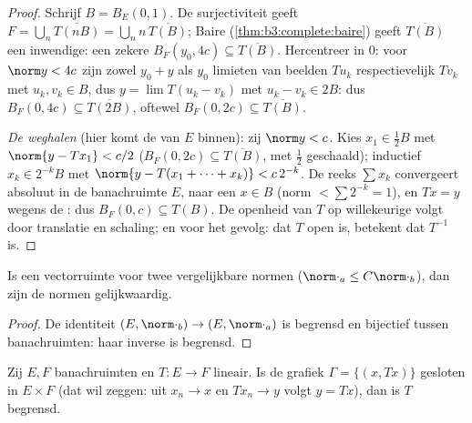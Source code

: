 \begin{proof}
Schrijf $B = B_E(0,1)$. De surjectiviteit geeft $F = \bigcup_n
\overline{T(nB)} = \bigcup_n n\,\overline{T(B)}$; Baire
(\cref{thm:b3:complete:baire}) geeft $\overline{T(B)}$ een
inwendige: een zekere $B_F(y_0, 4c) \subseteq \overline{T(B)}$.
Hercentreer in $0$: voor $\norm y < 4c$ zijn zowel $y_0 + y$ als
$y_0$ limieten van beelden $Tu_k$ respectievelijk $Tv_k$ met $u_k,
v_k \in B$, dus $y = \lim T(u_k - v_k)$ met $u_k - v_k \in 2B$:
dus $B_F(0, 4c) \subseteq \overline{T(2B)}$, oftewel $B_F(0, 2c)
\subseteq \overline{T(B)}$.

\emph{De  weghalen} (hier komt de  van $E$
binnen): zij $\norm y < c$. Kies $x_1 \in \frac12 B$ met $\norm{y
- Tx_1} < c/2$ ($B_F(0,2c) \subseteq \overline{T(B)}$, met
$\frac12$ geschaald); inductief $x_k \in 2^{-k}B$ met $\norm{y -
T(x_1 + \dots + x_k)} < c\,2^{-k}$. De reeks $\sum x_k$
convergeert absoluut in de banachruimte $E$, naar een $x \in B$
(norm $< \sum 2^{-k} = 1$), en $Tx = y$ wegens de :
dus $B_F(0, c) \subseteq T(B)$. De openheid van $T$ op
willekeurige  volgt door translatie en
schaling; en voor het gevolg: dat $T$ open is, betekent dat
$T^{-1}$  is.
\end{proof}

\begin{corollary}\label{cor:b3:banach:equivnorms}
Is een vectorruimte  voor twee vergelijkbare normen
($\norm\cdot_a \leq C\norm\cdot_b$), dan zijn de normen
gelijkwaardig.
\end{corollary}

\begin{proof}
De identiteit $(E, \norm\cdot_b) \to (E, \norm\cdot_a)$ is
begrensd en bijectief tussen banachruimten: haar inverse is
begrensd.
\end{proof}

\begin{theorem}\label{thm:b3:banach:closedgraph}
Zij $E, F$ banachruimten en $T \colon E \to F$ lineair. Is de
grafiek $\Gamma = \{(x, Tx)\}$ gesloten in $E \times F$ (dat wil
zeggen: uit $x_n \to x$ en $Tx_n \to y$ volgt $y = Tx$), dan is
$T$ begrensd.
\end{theorem}

